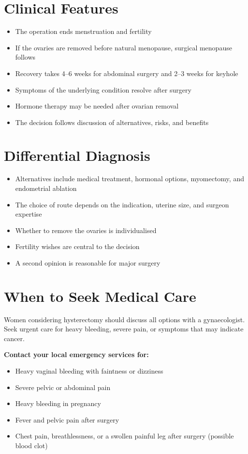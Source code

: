 \section*{Clinical Features}
\begin{itemize}
    \item The operation ends menstruation and fertility
    \item If the ovaries are removed before natural menopause, surgical menopause follows
    \item Recovery takes 4--6 weeks for abdominal surgery and 2--3 weeks for keyhole
    \item Symptoms of the underlying condition resolve after surgery
    \item Hormone therapy may be needed after ovarian removal
    \item The decision follows discussion of alternatives, risks, and benefits
\end{itemize}

\section*{Differential Diagnosis}
\begin{itemize}
    \item Alternatives include medical treatment, hormonal options, myomectomy, and endometrial ablation
    \item The choice of route depends on the indication, uterine size, and surgeon expertise
    \item Whether to remove the ovaries is individualised
    \item Fertility wishes are central to the decision
    \item A second opinion is reasonable for major surgery
\end{itemize}

\section*{When to Seek Medical Care}
Women considering hysterectomy should discuss all options with a gynaecologist. Seek urgent care for heavy bleeding, severe pain, or symptoms that may indicate cancer.

\textbf{Contact your local emergency services for:}
\begin{itemize}
    \item Heavy vaginal bleeding with faintness or dizziness
    \item Severe pelvic or abdominal pain
    \item Heavy bleeding in pregnancy
    \item Fever and pelvic pain after surgery
    \item Chest pain, breathlessness, or a swollen painful leg after surgery (possible blood clot)
\end{itemize}


